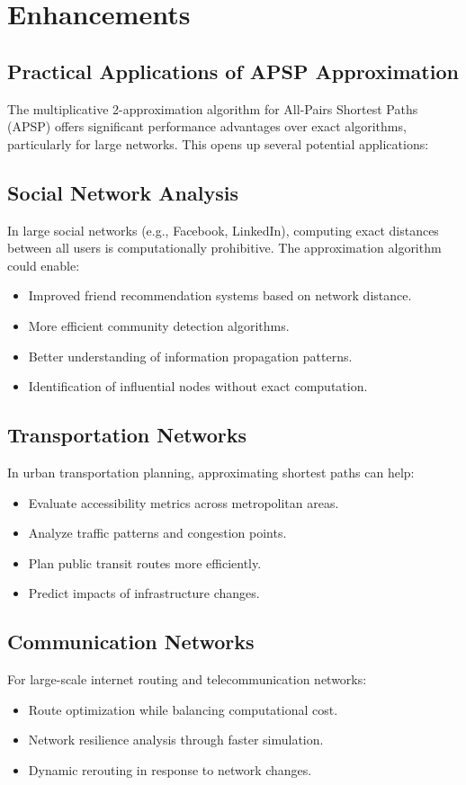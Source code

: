 \documentclass[a4paper,11pt,oneside]{book}
\begin{document}
\section{Enhancements}

\subsection{Practical Applications of APSP Approximation}
The multiplicative 2-approximation algorithm for All-Pairs Shortest Paths (APSP) offers significant performance advantages over exact algorithms, particularly for large networks. This opens up several potential applications:

\subsection{ Social Network Analysis}
In large social networks (e.g., Facebook, LinkedIn), computing exact distances between all users is computationally prohibitive. The approximation algorithm could enable:
\begin{itemize}
    \item Improved friend recommendation systems based on network distance.
    \item More efficient community detection algorithms.
    \item Better understanding of information propagation patterns.
    \item Identification of influential nodes without exact computation.
\end{itemize}

\subsection{Transportation Networks}
In urban transportation planning, approximating shortest paths can help:
\begin{itemize}
    \item Evaluate accessibility metrics across metropolitan areas.
    \item Analyze traffic patterns and congestion points.
    \item Plan public transit routes more efficiently.
    \item Predict impacts of infrastructure changes.
\end{itemize}

\subsection{Communication Networks}
For large-scale internet routing and telecommunication networks:
\begin{itemize}
    \item Route optimization while balancing computational cost.
    \item Network resilience analysis through faster simulation.
    \item Dynamic rerouting in response to network changes.
\end{itemize}
\end{document}
